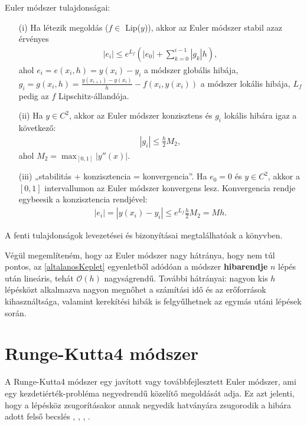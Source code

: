 \begin{theorem}
	Euler módszer tulajdonságai:
	\begin{itemize}
		\item[(i)] Ha létezik megoldás ($ f \in $ Lip($ y $)), akkor az Euler módszer stabil azaz érvényes
		\begin{align*}
			|e_{i}| \leq e^{L_{f}} \left(|e_{0}| + \displaystyle\sum_{k=0}^{i-1} |g_{k}|h \right),
		\end{align*}
		ahol $ e_{i} = e(x_{i},h) = y(x_{i})-y_{i} $ a módszer globális hibája, $ g_{i} = g(x_{i},h) = \frac{y(x_{i+1})-y(x_{i})}{h} - f(x_{i},y(x_{i})) $ a módszer lokális hibája, $ L_{f} $ pedig az $ f $ Lipschitz-állandója.
		\item[(ii)] Ha $ y \in C^{2} $, akkor az Euler módszer konzisztens és $ g_{i} $ lokális hibára igaz a következő:
		\begin{align*}
			|g_{i}| \leq \frac{h}{2}M_{2},
		\end{align*}
		ahol $ M_{2} = \displaystyle\max_{[0,1]} |y''(x)|$.
		\item[(iii)] „stabilitás + konzisztencia = konvergencia”. Ha $ e_{0} = 0 $ és $ y \in C^{2} $, akkor a $ [0,1] $ intervallumon az Euler módszer konvergens lesz. Konvergencia rendje egybeesik a konzisztencia rendjével:
		\begin{align*}
			|e_{i}| = |y(x_{i})-y_{i}| \leq e^{L_{f}}\frac{h}{2}M_{2} = Mh.
		\end{align*}
	\end{itemize}
\end{theorem}
A fenti tulajdonságok levezetései és bizonyításai megtalálhatóak a \cite{DiffEgyenletesKonyv} könyvben. \newline

Végül megemlíteném, hogy az Euler módszer nagy hátránya, hogy nem túl pontos, az \eqref{altalanosKeplet} egyenletből adódóan a módszer \textbf{hibarendje} $ n $ lépés után lineáris, tehát \textbf{$\mathcal{O}(h)$} nagyságrendű. További hátrányai: nagyon kis $ h $ lépésközt alkalmazva nagyon megnőhet a számítási idő és az erőforrások kihasználtsága, valamint kerekítési hibák is felgyűlhetnek az egymás utáni lépések során.
\newpage

\section {Runge-Kutta4 módszer}

A Runge-Kutta4 módszer egy javított vagy továbbfejlesztett Euler módszer, ami egy kezdetiérték-probléma negyedrendű közelítő megoldását adja. Ez azt jelenti, hogy a lépésköz zsugorításakor annak negyedik hatványára zsugorodik a hibára adott felső becslés \cite{KupanPalJegyzet}, \cite{DiffEgyenletesKonyv}, \cite{Diplomadolgozat}, \cite{RungeKuttaFormula}.

